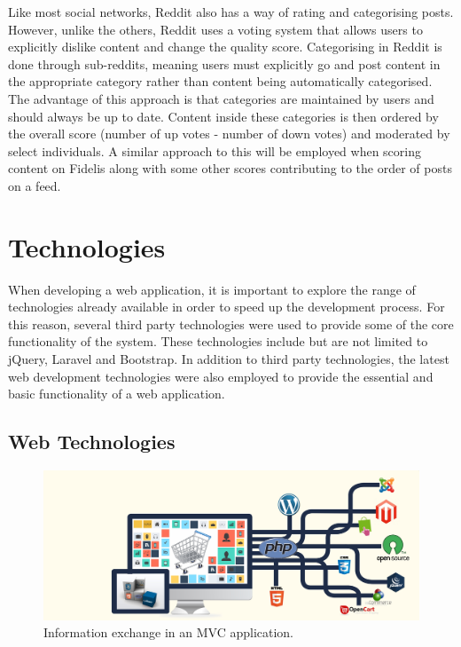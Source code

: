 Like most social networks, Reddit also has a way of rating and categorising posts. However, unlike the others, Reddit uses a voting system that allows users to explicitly dislike content and change the quality score. Categorising in Reddit is done through sub-reddits, meaning users must explicitly go and post content in the appropriate category rather than content being automatically categorised. The advantage of this approach is that categories are maintained by users and should always be up to date. Content inside these categories is then ordered by the overall score (number of up votes - number of down votes) and moderated by select individuals. A similar approach to this will be employed when scoring content on Fidelis along with some other scores contributing to the order of posts on a feed.

\section{Technologies}
\label{Section:Technologies}
When developing a web application, it is important to explore the range of technologies already available in order to speed up the development process. For this reason, several third party technologies were used to provide some of the core functionality of the system. These technologies include but are not limited to jQuery, Laravel and Bootstrap. In addition to third party technologies, the latest web development technologies were also employed to provide the essential and basic functionality of a web application.

\subsection{Web Technologies} \label{Section:Web_Technologies}

\begin{figure}[H]
  \centering
  \includegraphics[width=1.0\textwidth]{Images/Research/Technologies/WebTechnologies}
  \caption{Information exchange in an MVC application.} \label{fig:WebTechnologies} 
\end{figure}

